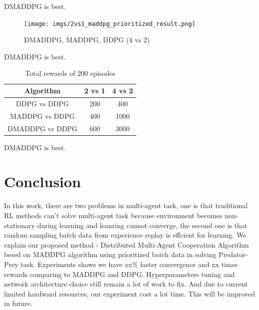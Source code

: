 \documentclass[11pt,twocolumn]{jarticle} %
\begin{document}
DMADDPG is best.

\begin{figure}[ht]
 \begin{center}
  \texttt{[image: imgs/2vs1\_maddpg\_prioritized\_result.png]}
  \caption{DMADDPG, MADDPG, DDPG (4 vs 2)}
  \label{fig:result1}
 \end{center}
\end{figure}

DMADDPG is best.

\begin{table}[ht]
 \caption{Total rewards of 200 episodes} 
 \label{tbl:reward}
  \begin{center}
    \begin{tabular}{|c|c|c|}
    \hline
    Algorithm  & 2 vs 1 & 4 vs 2 \\
    \hline \hline
    DDPG vs DDPG     & 200 & 400  \\\hline
    MADDPG vs DDPG   & 400 & 1000 \\\hline
    DMADDPG vs DDPG  & 600 & 3000 \\\hline
    \end{tabular}
  \end{center}
\end{table}
DMADDPG is best.

\section{Conclusion}
In this work, there are two problems in multi-agent task, one is that traditional RL methods can't solve multi-agent task because environment becomes non-stationary during learning and leanring cannot converge, the second one is that random sampling batch data from experience replay is effcient for learning. We explain our proposed method - Distributed Multi-Agent Cooperation Algorithm besed on MADDPG algorithm using prioritized batch data in solving Predator-Prey task. Experiments shows we have xx\% faster convergence and xx times rewards comparing to MADDPG and DDPG.
Hyperparameters tuning and network architecture choice still remain a lot of work to fix.
And due to current limited hardward resources, our experiment cost a lot time. This will be improved in future.
\end{document}
